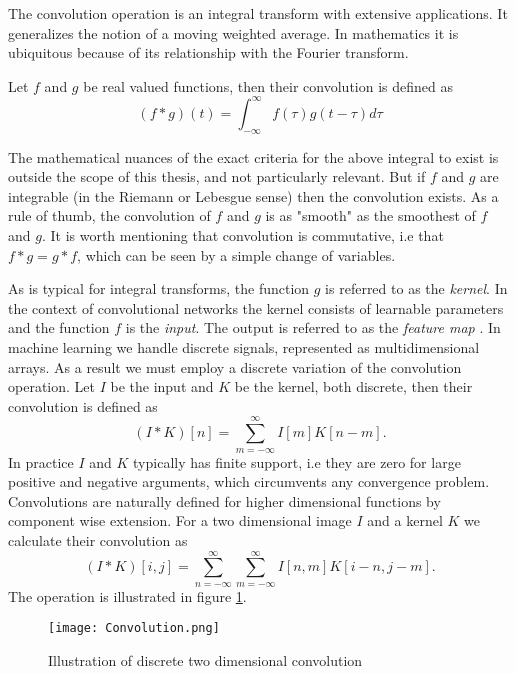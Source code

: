 \documentclass[../../thesis.tex]{subfiles}
\begin{document}

The convolution operation is an integral transform with extensive applications. It generalizes the notion of a moving weighted average. In mathematics it is ubiquitous because of its relationship with the Fourier transform.\newline

Let $f$ and $g$ be real valued functions, then their convolution is defined as
\begin{equation}
    (f*g)(t) = \int_{-\infty}^{\infty} f(\tau)g(t-\tau) d\tau
\end{equation}

The mathematical nuances of the exact criteria for the above integral to exist is outside the scope of this thesis, and not particularly relevant. But if $f$ and $g$ are integrable (in the Riemann or Lebesgue sense) then the convolution exists. As a rule of thumb, the convolution of $f$ and $g$ is as "smooth" as the smoothest of $f$ and $g$. It is worth mentioning that convolution is commutative, i.e that $f*g = g*f$, which can be seen by a simple change of variables. \newline

As is typical for integral transforms, the function $g$ is referred to as the \textit{kernel}. In the context of convolutional networks the kernel consists of learnable parameters and the function $f$ is the \textit{input}. The output is referred to as the \textit{feature map} \cite{deeplearningbook}. In machine learning we handle discrete signals, represented as multidimensional arrays. As a result we must employ a discrete variation of the convolution operation. Let $I$ be the input and $K$ be the kernel, both discrete, then their convolution is defined as
\begin{equation}
    (I*K)[n] = \sum_{m=-\infty}^{\infty} I[m]K[n-m].
\end{equation}
In practice $I$ and $K$ typically has finite support, i.e they are zero for large positive and negative arguments, which circumvents any convergence problem.\newline
Convolutions are naturally defined for higher dimensional functions by component wise extension. For a two dimensional image $I$ and a kernel $K$ we calculate their convolution as 
\begin{equation}
    (I*K)[i,j] = \sum_{n=-\infty}^{\infty}\sum_{m=-\infty}^{\infty} I[n,m]K[i - n,j - m]. 
\end{equation}
The operation is illustrated in figure \ref{fig:Convolution}.
\begin{figure}[h]
    \label{fig:Convolution}
    \texttt{[image: Convolution.png]}
    \centering    
    \caption{Illustration of discrete two dimensional convolution}
\end{figure}
\end{document}
